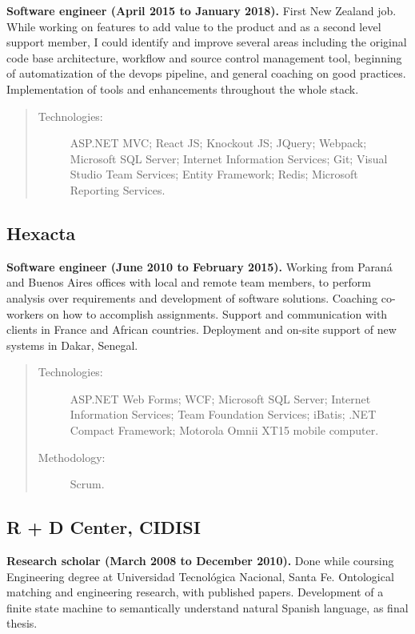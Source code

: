 \textbf{Software engineer (April 2015 to January 2018).} First New Zealand job. While working on features to add value to the product and as a second level support member, I could identify and improve several areas including the original code base architecture, workflow and source control management tool, beginning of automatization of the devops pipeline, and general coaching on good practices. Implementation of tools and enhancements throughout the whole stack.

\begin{quote}
\begin{description}
    \item[Technologies:] ASP.NET MVC; React JS; Knockout JS; JQuery; Webpack; Microsoft SQL Server; Internet Information Services; Git; Visual Studio Team Services; Entity Framework; Redis; Microsoft Reporting Services.
\end{description}
\end{quote}

\subsection*{Hexacta}

\textbf{Software engineer (June 2010 to February 2015).} Working from Paraná and Buenos Aires offices with local and remote team members, to perform analysis over requirements and development of software solutions. Coaching co-workers on how to accomplish assignments. Support and communication with clients in France and African countries. Deployment and on-site support of new systems in Dakar, Senegal.

\begin{quote}
\begin{description}
    \item[Technologies:] ASP.NET Web Forms; WCF; Microsoft SQL Server; Internet Information Services; Team Foundation Services; iBatis; .NET Compact Framework; Motorola Omnii XT15 mobile computer.
    \item[Methodology:] Scrum.
\end{description}
\end{quote}

\subsection*{R + D Center, CIDISI}

\textbf{Research scholar (March 2008 to December 2010).} Done while coursing Engineering degree at Universidad Tecnológica Nacional, Santa Fe. Ontological matching and engineering research, with published papers. Development of a finite state machine to semantically understand natural Spanish language, as final thesis.
